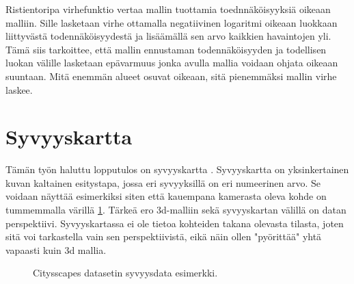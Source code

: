 Ristientoripa virhefunktio vertaa mallin tuottamia toednnäköisyyksiä oikeaan malliin. 
Sille lasketaan virhe ottamalla negatiivinen logaritmi oikeaan luokkaan liittyvästä todennäköisyydestä ja lisäämällä sen arvo kaikkien havaintojen yli.
Tämä siis tarkoittee, että mallin ennustaman todennäköisyyden ja todellisen luokan välille lasketaan epävarmuus jonka avulla mallia voidaan ohjata oikeaan suuntaan.
Mitä enemmän alueet osuvat oikeaan, sitä pienemmäksi mallin virhe laskee.

\section{Syvyyskartta}

Tämän työn haluttu lopputulos on syvyyskartta \cite{IkeuchiKatsushi1987DaDM}.
Syvyyskartta on yksinkertainen kuvan kaltainen esitystapa, jossa eri syvyyksillä on eri numeerinen arvo.
Se voidaan näyttää esimerkiksi siten että kauempana kamerasta oleva kohde on tummemmalla värillä \ref{fig:depth}.
Tärkeä ero 3d-malliin sekä syvyyskartan välillä on datan perspektiivi.
Syvyyskartassa ei ole tietoa kohteiden takana olevasta tilasta, joten sitä voi tarkastella vain sen perspektiivistä, eikä näin ollen "pyörittää" yhtä vapaasti kuin 3d mallia.


\begin{figure}[h]
\centering
{}
\caption[Tämä on lyhyt kuvateksti.]{Citysscapes datasetin syvyysdata esimerkki.}
\label{fig:depth}
\end{figure}
